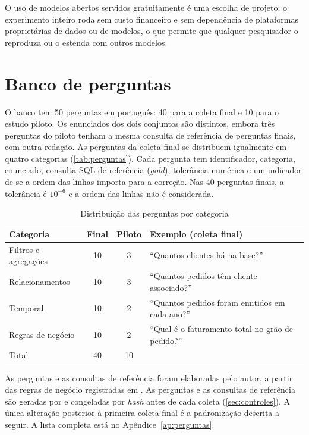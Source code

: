 O uso de modelos abertos servidos gratuitamente é uma escolha de projeto:
o experimento inteiro roda sem custo financeiro e sem dependência de
plataformas proprietárias de dados ou de modelos, o que permite que
qualquer pesquisador o reproduza ou o estenda com outros modelos.

\section{Banco de perguntas}
\label{sec:perguntas}

O banco tem 50 perguntas em português: 40 para a coleta final e 10 para o
estudo piloto. Os enunciados dos dois conjuntos são distintos, embora três
perguntas do piloto tenham a mesma consulta de referência de perguntas
finais, com outra redação. As perguntas da coleta final se distribuem
igualmente em quatro categorias (\autoref{tab:perguntas}). Cada pergunta
tem identificador, categoria, enunciado, consulta SQL de referência
(\textit{gold}), tolerância numérica e um indicador de se a ordem das linhas
importa para a correção. Nas 40 perguntas finais, a tolerância é
$10^{-6}$ e a ordem das linhas não é considerada.

\begin{table}[htb]
  \centering
  \caption{Distribuição das perguntas por categoria}
  \label{tab:perguntas}
  \begin{tabularx}{\textwidth}{lccX}
    \toprule
    Categoria & Final & Piloto & Exemplo (coleta final) \\
    \midrule
    Filtros e agregações & 10 & 3 & ``Quantos clientes há na base?'' \\
    Relacionamentos & 10 & 3 & ``Quantos pedidos têm cliente associado?'' \\
    Temporal & 10 & 2 & ``Quantos pedidos foram emitidos em cada ano?'' \\
    Regras de negócio & 10 & 2 & ``Qual é o faturamento total no grão de pedido?'' \\
    \midrule
    Total & 40 & 10 & \\
    \bottomrule
  \end{tabularx}
\end{table}

As perguntas e as consultas de referência foram elaboradas pelo autor, a
partir das regras de negócio registradas em .
As perguntas e as consultas de referência são geradas por
 e congeladas por \textit{hash} antes de cada
coleta (\autoref{sec:controles}). A única alteração posterior à primeira
coleta final é a padronização descrita a seguir. A lista completa está no
Apêndice~\ref{ap:perguntas}.

